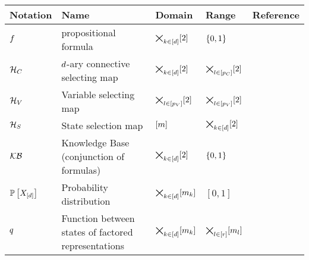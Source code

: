 \begin{center}
    \begin{tabular}{|p{\fivecolumnwidth}|p{\threecolumnwidth}|p{\fivecolumnwidth}|p{\fivecolumnwidth}|p{\fivecolumnwidth}|}
        \hline
        \rule{0pt}{\rowheight} \textbf{Notation} & \textbf{Name}                                       & \textbf{Domain}                                             & \textbf{Range}                                              & \textbf{Reference}                   \\
        \hline
        \rule{0pt}{\rowheight} $f$      & propositional formula                               & $\bigtimes_{k\in[d]}[2]$                                               & $\{0,1\}$                                                    & {def:formulas}                \\
        \rule{0pt}{\rowheight} $\mathcal{H}_{C}$  & $d$-ary connective selecting map & $\bigtimes_{k\in[d]}[2]$                                               & $\bigtimes_{l\in[p_{C}]}[2]$ & {def:connectiveSelector} \\
        \rule{0pt}{\rowheight} $\mathcal{H}_{V}$  & Variable selecting map                              & $\bigtimes_{l\in[p_{V}]}[2]$ & $\bigtimes_{l\in[p_{V}]}[2]$ & {def:variableSelector} \\ %
        \rule{0pt}{\rowheight} $\mathcal{H}_{S}$  & State selection map                                 & $[m]$                                                 & $\bigtimes_{k\in[d]}[2]$ & {def:stateSelector} \\
        \rule{0pt}{\rowheight} $\mathcal{KB}$             & Knowledge Base (conjunction of formulas)            & $\bigtimes_{k\in[d]}[2]$                                               & $\{0,1\}$                                                    &                                      \\
        \rule{0pt}{\rowheight} $\mathbb{P}\left[X_{[d]}\right]$       & Probability distribution                            & $\bigtimes_{k\in[d]}[m_{k}]$                                                & $[0,1]$                                                     & {def:probabilityDistribution} \\
        \rule{0pt}{\rowheight} $q$     & Function between states of factored representations                   & $\bigtimes_{k\in[d]}[m_{k}]$                                                & $\bigtimes_{l\in[r]}[m_{l}]$                                             &                                      \\
        \hline
    \end{tabular}
\end{center}

